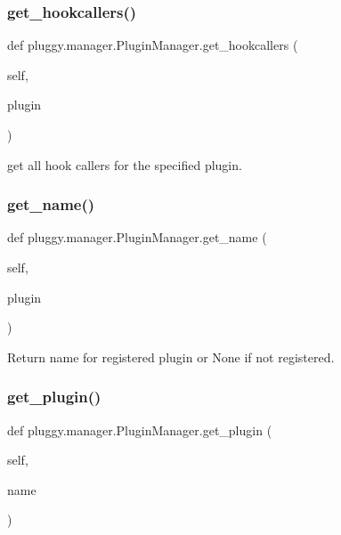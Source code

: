 \subsubsection{\texorpdfstring{get\+\_\+hookcallers()}{get\_hookcallers()}}
{\footnotesize\ttfamily def pluggy.\+manager.\+Plugin\+Manager.\+get\+\_\+hookcallers (\begin{DoxyParamCaption}\item[{}]{self,  }\item[{}]{plugin }\end{DoxyParamCaption})}

\begin{DoxyVerb}get all hook callers for the specified plugin. \end{DoxyVerb}
 \mbox{\label{classpluggy_1_1manager_1_1_plugin_manager_a46be59b9190e87a0d3007a13bd989f56}} 
\subsubsection{\texorpdfstring{get\+\_\+name()}{get\_name()}}
{\footnotesize\ttfamily def pluggy.\+manager.\+Plugin\+Manager.\+get\+\_\+name (\begin{DoxyParamCaption}\item[{}]{self,  }\item[{}]{plugin }\end{DoxyParamCaption})}

\begin{DoxyVerb}Return name for registered plugin or None if not registered. \end{DoxyVerb}
 \mbox{\label{classpluggy_1_1manager_1_1_plugin_manager_a06f6db97612dbde40933aa41c570ea46}} 
\subsubsection{\texorpdfstring{get\+\_\+plugin()}{get\_plugin()}}
{\footnotesize\ttfamily def pluggy.\+manager.\+Plugin\+Manager.\+get\+\_\+plugin (\begin{DoxyParamCaption}\item[{}]{self,  }\item[{}]{name }\end{DoxyParamCaption})}

